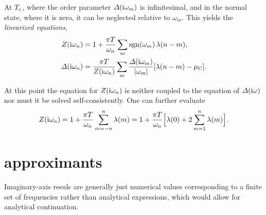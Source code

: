 At $T \sb{\text{c}}$, where the order parameter $\varDelta(\mathrm i \omega_m)$ is infinitesimal,
and in the normal state, where it is zero, it can be neglected relative to
$\omega_m$. This yields the \emph{linearized  equations},
%
\begin{subequations} \label{linearized Eliashberg equations}
    \begin{align}
        Z(\mathrm i \omega_n) &= 1 + \frac{\pi T}{\omega_n} \sum_m
        \operatorname{sgn}(\omega_m) \, \lambda(n - m),
        \\
        \varDelta(\mathrm i \omega_n) &= \frac{\pi T}{Z(\mathrm i \omega_n)} \sum_m
        \frac{\varDelta(\mathrm i \omega_m)}{|\omega_m|}
        [\lambda(n - m) - \mu \sb{\text{C}}].
    \end{align}
\end{subequations}

At this point the equation for $Z(\mathrm i \omega_n)$ is neither coupled to the
equation of $\varDelta(\mathrm i \omega)$ nor must it be solved self-consistently. One can
further evaluate
%
\begin{equation} \label{normal-state renormalization}
    Z(\mathrm i \omega_n) = 1 + \frac{\pi T}{\omega_n} \sum_{m=-n}^n \lambda(m)
    = 1 + \frac{\pi T}{\omega_n}
    \Big[ \lambda(0) + 2 \sum_{m=1}^n \lambda(m) \Big].
\end{equation}

\section{ approximants}

Imaginary-axis resuls are generally just numerical values corresponding to a
finite set of  frequencies rather than analytical expressions,
which would allow for analytical continuation.
